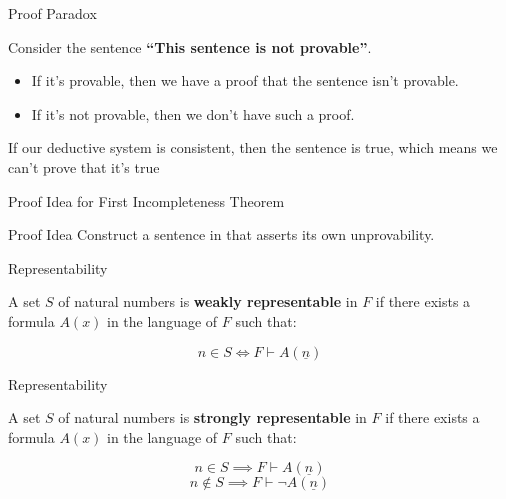 \documentclass{beamer}
\begin{document}
\begin{frame}{Proof Paradox}

  Consider the sentence \textbf{``This sentence is not provable''}.

  \pause

  \begin{itemize}
  \item[] If it's provable, then we have a proof that the sentence isn't
    provable. \Frowny \pause
  \item[] If it's not provable, then we don't have such a proof. \Smiley
    \pause
  \end{itemize}

  If our deductive system is consistent, then the sentence is true, which means
  we can't prove that it's true

\end{frame}

\begin{frame}{Proof Idea for First Incompleteness Theorem}

  \begin{block}{Proof Idea}
    Construct a sentence in \robinson{} that asserts its own unprovability.
  \end{block}

\end{frame}

\begin{frame}{Representability}
  \begin{definition}
    A set $S$ of natural numbers is \textbf{weakly representable} in $F$ if
    there exists a formula $A(x)$ in the language of $F$ such that:

    $$n \in S \iff F \vdash A(\underline{n}) $$
  \end{definition}
\end{frame}

\begin{frame}{Representability}
  \begin{definition}
    A set $S$ of natural numbers is \textbf{strongly representable} in $F$ if
    there exists a formula $A(x)$ in the language of $F$ such that:

    $$n \in S \implies F \vdash A(\underline{n})$$
    $$n \notin S  \implies F \vdash \neg A(\underline{n})$$

  \end{definition}
\end{frame}
\end{document}
